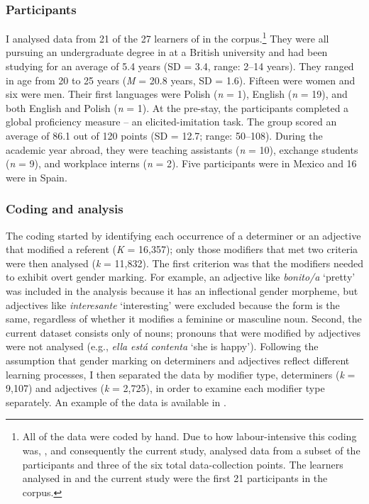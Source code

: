 \documentclass[output=paper,colorlinks,citecolor=brown,modfonts,nonflat]{../langscibook}
\begin{document}
\subsubsection{Participants}\label{sec:gudmestad:3.1.2}

I analysed data from 21 of the 27 learners of  in the corpus.\footnote{{All of the data were coded by hand. Due to how labour-intensive this coding was, \citet{GudmestadEtAl2019}, and consequently the current study, analysed data from a subset of the participants and three of the six total data-collection points. The learners analysed in \citeauthor{GudmestadEtAl2019} and the current study were the first 21 participants in the corpus.}} They were all pursuing an undergraduate degree in  at a British university and had been studying  for an average of 5.4 years (SD = 3.4, range: 2--14 years). They ranged in age from 20 to 25 years (\textit{M} = 20.8 years, SD = 1.6). Fifteen were women and six were men. Their first languages were Polish (\textit{n} = 1), English (\textit{n} = 19), and both English and Polish (\textit{n} = 1). At the pre-stay, the participants completed a global proficiency measure – an elicited-imitation task. The group scored an average of 86.1 out of 120 points (SD = 12.7; range: 50--108). During the academic year abroad, they were teaching assistants (\textit{n} = 10), exchange students (\textit{n} = 9), and workplace interns (\textit{n} = 2). Five participants were in Mexico and 16 were in Spain.


\subsubsection{Coding and analysis}\label{sec:gudmestad:3.1.3}

The coding started by identifying each occurrence of a determiner or an adjective that modified a referent (\textit{K} = 16,357); only those modifiers that met two criteria were then analysed (\textit{k} = 11,832). The first criterion was that the modifiers needed to exhibit overt gender marking. For example, an adjective like \textit{bonito/a} ‘pretty’ was included in the analysis because it has an inflectional gender morpheme, but adjectives like \textit{interesante} ‘interesting’ were excluded because the form is the same, regardless of whether it modifies a feminine or masculine noun. Second, the current dataset consists only of nouns; pronouns that were modified by adjectives were not analysed (e.g., \textit{ella} \textit{está} \textit{contenta} ‘she is happy’). Following the assumption that gender marking on determiners and adjectives reflect different learning processes, I then separated the data by modifier type, determiners (\textit{k} = 9,107) and adjectives (\textit{k} = 2,725), in order to examine each modifier type separately. An example of the data is available in .
\end{document}
